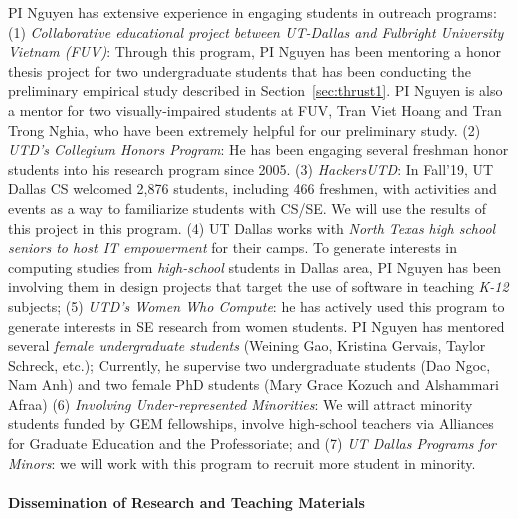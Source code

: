 PI Nguyen has extensive experience in engaging students in outreach
programs: (1) {\em Collaborative educational project between UT-Dallas
and Fulbright University Vietnam (FUV)}: Through this program, PI
Nguyen has been mentoring a honor thesis project for two undergraduate
students that has been conducting the preliminary empirical study
described in Section~\ref{sec:thrust1}. PI Nguyen is also a mentor for
two visually-impaired students at FUV, Tran Viet Hoang and Tran Trong
Nghia, who have been extremely helpful for our preliminary study.
(2) {\em UTD's Collegium Honors Program}: He
has been engaging several freshman honor students into his research
program since 2005. (3) {\em HackersUTD}: In Fall'19, UT Dallas CS
welcomed 2,876 students, including 466 freshmen, with activities and
events as a way to familiarize students with CS/SE. We will use the
results of this project in this program.
%
(4) UT Dallas works with {\em North Texas high school seniors to host
IT empowerment} for their camps. To generate interests in computing
studies from {\em high-school} students in Dallas area, PI Nguyen has
been involving them in design projects that target the use of software
in teaching {\em K-12} subjects; (5) {\em UTD's Women Who Compute}: he
has actively used this program to generate interests in SE research
from women students. PI Nguyen has mentored several {\em female
undergraduate students} (Weining Gao, Kristina Gervais, Taylor
Schreck, etc.); Currently, he supervise two undergraduate students
(Dao Ngoc, Nam Anh) and two female PhD students (Mary Grace Kozuch and
Alshammari Afraa) (6) {\em Involving Under-represented Minorities}: We
will attract minority students funded by GEM fellowships, involve
high-school teachers via Alliances for Graduate Education and the
Professoriate; and (7) {\em UT Dallas Programs for Minors}: we will
work with this program to recruit more student in minority.


\paragraph{Dissemination of Research and Teaching Materials}

